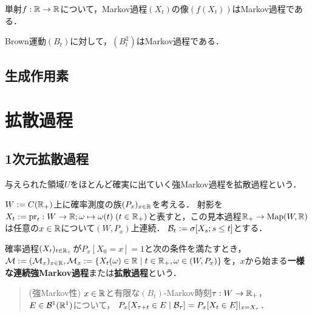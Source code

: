 \documentclass[uplatex,dvipdfmx]{jsreport}
\begin{document}
\begin{proposition}
    単射$f:\mathbb{R}\to\mathbb{R}$について，Markov過程$(X_t)$の像$(f(X_t))$はMarkov過程である．
\end{proposition}

\begin{proposition}
    Brown運動$(B_t)$に対して，$(B_t^2)$はMarkov過程である．
\end{proposition}

\section{生成作用素}



\chapter{拡散過程}

\section{1次元拡散過程}

\begin{tcolorbox}[colframe=ForestGreen, colback=ForestGreen!10!white,breakable,colbacktitle=ForestGreen!40!white,coltitle=black,fonttitle=\bfseries\sffamily,
title=]
    与えられた領域$U$をほとんど確実に出ていく強Markov過程を拡散過程という．
\end{tcolorbox}

\begin{notation}
    $W:=C(\mathbb{R}_+)$上に確率測度の族$(P_x)_{x\in\mathbb{R}}$を考える．
    射影を$X_t:=\mathrm{pr}_t:W\to\mathbb{R};\omega\mapsto\omega(t)\;(t\in\mathbb{R}_+)$と表すと，この見本過程$\mathbb{R}_+\to\mathrm{Map}(W,\mathbb{R})$は任意の$x\in\mathbb{R}$について$(W,P_x)$上連続．
    $\mathcal{B}_t:=\sigma[X_s;s\le t]$とする．
\end{notation}

\begin{definition}
    確率過程$(X_t)_{t\in\mathbb{R}_+}$が$P_x[X_0=x]=1$と次の条件を満たすとき，$\mathcal{M}:=(\mathcal{M}_x)_{x\in\mathbb{R}},\mathcal{M}_x:=\left\{X_t(\omega)\in\mathbb{R}\mid t\in\mathbb{R}_+,\omega\in(W,P_x)\right\}$を，$x$から始まる\textbf{一様な連続強Markov過程}または\textbf{拡散過程}という．
    \begin{quote}
        (強Markov性) $x\in\mathbb{R}$と有限な$(B_t)$-Markov時刻$\tau:W\to\mathbb{R}_+$，$E\in\mathcal{B}^1(\mathbb{R}^1)$について，
        $P_x[X_{\tau+t}\in E\mid\mathcal{B}_\tau]=P_x[X_t\in E]|_{x=X_\tau}$．
    \end{quote}
\end{definition}
\end{document}
